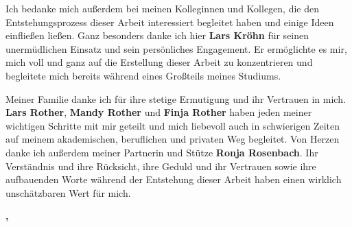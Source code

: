 Ich bedanke mich außerdem bei meinen Kolleginnen und Kollegen, die den Entstehungsprozess dieser Arbeit interessiert begleitet haben und einige Ideen einfließen ließen. Ganz besonders danke ich hier \textbf{Lars Kröhn} für seinen unermüdlichen Einsatz und sein persönliches Engagement. Er ermöglichte es mir, mich voll und ganz auf die Erstellung dieser Arbeit zu konzentrieren und begleitete mich bereits während eines Großteils meines Studiums.

Meiner Familie danke ich für ihre stetige Ermutigung und ihr Vertrauen in mich. \textbf{Lars Rother}, \textbf{Mandy Rother} und \textbf{Finja Rother} haben jeden meiner wichtigen Schritte mit mir geteilt und mich liebevoll auch in schwierigen Zeiten auf meinem akademischen, beruflichen und privaten Weg begleitet. Von Herzen danke ich außerdem meiner Partnerin und Stütze \textbf{Ronja Rosenbach}. Ihr Verständnis und ihre Rücksicht, ihre Geduld und ihr Vertrauen sowie ihre aufbauenden Worte während der Entstehung dieser Arbeit haben einen wirklich unschätzbaren Wert für mich.

\normalfont

\vspace{1em}
\begin{flushright}
    \textbf{\studentAName,\xspace \documentMonthOfYear \xspace \documentYear}
\end{flushright}
